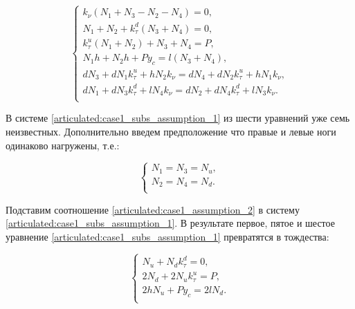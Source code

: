 \begin{equation}
\label{articulated:case1_subs_assumption_1}
  \left\{
    \begin{alignedat}{3}
      k_\nu(N_1 + N_3 - N_2 - N_4) = 0,\\
      N_1 + N_2 + k_\tau^d(N_3 + N_4) = 0,\\
      k_\tau^u(N_1 + N_2) + N_3 + N_4 = P,\\
      N_1h + N_2h + Py_c = l(N_3 + N_4), \\      
      dN_3 + dN_1k_\tau^u + hN_2k_\nu = dN_4 + dN_2k_\tau^u + hN_1k_\nu,\\
      dN_1 + dN_3k_\tau^d + lN_4k_\nu = dN_2 + dN_4k_\tau^d + lN_3k_\nu.\\
    \end{alignedat}
  \right.
\end{equation}

В системе \ref{articulated:case1_subs_assumption_1} из шести уравнений уже семь неизвестных. Дополнительно введем предположение что правые и левые ноги одинаково нагружены, т.е.:

\begin{equation}
\label{articulated:case1_assumption_2}
  \left\{
    \begin{alignedat}{3}
    N_1 = N_3 = N_u, \\
    N_2 = N_4 = N_d. \\
    \end{alignedat}
  \right.
\end{equation}


Подставим соотношение \ref{articulated:case1_assumption_2} в систему \ref{articulated:case1_subs_assumption_1}. В результате первое, пятое и шестое уравнение \ref{articulated:case1_subs_assumption_1} превратятся в тождества:

\begin{equation}
\label{articulated:case1_subs_assumption_2}
  \left\{
  \begin{alignedat}{3}
    N_u + N_dk_\tau^d = 0, \\
    2N_d + 2N_uk_\tau^u = P, \\
    2hN_u + Py_c = 2lN_d.\\
  \end{alignedat}
  \right.
\end{equation}


